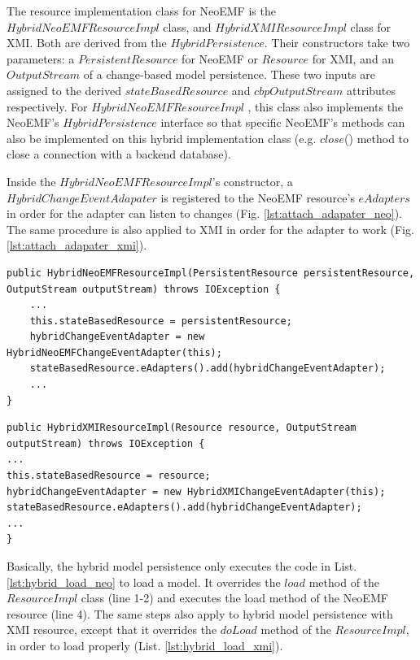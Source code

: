 \documentclass[10pt,conference]{IEEEtran}
\begin{document}
The resource implementation class for NeoEMF is the $HybridNeoEMFResourceImpl$ class, and $HybridXMIResourceImpl$ class for XMI. Both are derived from the $HybridPersistence$. Their constructors take two parameters: a $PersistentResource$ for NeoEMF or $Resource$ for XMI, and an $OutputStream$ of a change-based model persistence. These two inputs are assigned to the derived $stateBasedResource$ and $cbpOutputStream$ attributes respectively. For $HybridNeoEMFResourceImpl$ , this class also implements the NeoEMF's $HybridPersistence$ interface so that specific NeoEMF's methods can also be implemented on this hybrid implementation class (e.g. $close$() method to close a connection with a backend database). 

Inside the $HybridNeoEMFResourceImpl$'s constructor, a $HybridChangeEventAdapater$ is registered to the NeoEMF resource's $eAdapters$ in order for the adapter can listen to changes (Fig. \ref{lst:attach_adapater_neo}). The same procedure is also applied to XMI in order for the adapter to work (Fig. \ref{lst:attach_adapater_xmi}). 

\begin{lstlisting}[style=java,caption={A simplified code to connect a change-based model persistence's event adapater to a NeoEMF resource.},label=lst:attach_adapater_neo]
public HybridNeoEMFResourceImpl(PersistentResource persistentResource, OutputStream outputStream) throws IOException {
    ...
    this.stateBasedResource = persistentResource;
    hybridChangeEventAdapter = new HybridNeoEMFChangeEventAdapter(this);
    stateBasedResource.eAdapters().add(hybridChangeEventAdapter);
    ...
}
\end{lstlisting}

\begin{lstlisting}[style=java,caption={A simplified code to connect a change-based model persistence's event adapater to an XMI resource.},label=lst:attach_adapater_xmi]
public HybridXMIResourceImpl(Resource resource, OutputStream outputStream) throws IOException {
...
this.stateBasedResource = resource;
hybridChangeEventAdapter = new HybridXMIChangeEventAdapter(this);
stateBasedResource.eAdapters().add(hybridChangeEventAdapter);
...
}
\end{lstlisting}

Basically, the hybrid model persistence only executes the code in List. \ref{lst:hybrid_load_neo} to load a model. It overrides the $load$ method of the $ResourceImpl$ class (line 1-2) and executes the load method of the NeoEMF resource (line 4). The same steps also apply to hybrid model persistence with XMI resource, except that it overrides the $doLoad$ method of the $ResourceImpl$, in order to load properly (List. \ref{lst:hybrid_load_xmi}). 
\end{document}
